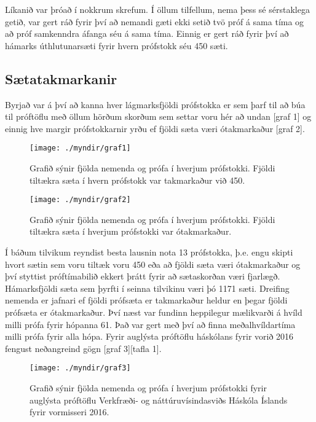 \documentclass[12pt]{article}
\begin{document}
Líkanið var þróað í nokkrum skrefum. Í öllum tilfellum, nema þess sé sérstaklega getið, var gert ráð fyrir því að nemandi gæti ekki setið tvö próf á sama tíma og að próf samkenndra áfanga séu á sama tíma. Einnig er gert ráð fyrir því að hámarks úthlutunarsæti fyrir hvern prófstokk séu 450 sæti.

\subsection{Sætatakmarkanir}

Byrjað var á því að kanna hver lágmarksfjöldi prófstokka er sem þarf til að búa til próftöflu með öllum hörðum skorðum sem settar voru hér að undan [graf 1] og einnig hve margir prófstokkarnir yrðu ef fjöldi sæta væri ótakmarkaður [graf 2]. 


\begin{figure}[h]
\centering
\texttt{[image: ./myndir/graf1]}
\caption{Grafið sýnir fjölda nemenda og prófa í hverjum prófstokki. Fjöldi tiltækra sæta í hvern prófstokk var takmarkaður við 450.}
\end{figure}

\begin{figure}[h]
    \centering
    \texttt{[image: ./myndir/graf2]}
    \caption{Grafið sýnir fjölda nemenda og prófa í hverjum prófstokki. Fjöldi tiltækra sæta í hverjum prófstokki var ótakmarkaður.}
\end{figure}





Í báðum tilvikum reyndist besta lausnin nota 13 prófstokka, þ.e. engu skipti hvort sætin sem voru tiltæk voru 450 eða að fjöldi sæta væri ótakmarkaður og því styttist próftímabilið ekkert þrátt fyrir að sætaskorðan væri fjarlægð. Hámarksfjöldi sæta sem þyrfti í seinna tilvikinu væri þó 1171 sæti. Dreifing nemenda er jafnari ef fjöldi prófsæta er takmarkaður heldur en þegar fjöldi prófsæta er ótakmarkaður. 
Því næst var fundinn heppilegur mælikvarði á hvíld milli prófa fyrir hópanna 61. Það var gert með því að finna meðalhvíldartíma milli prófa fyrir alla hópa. Fyrir auglýsta próftöflu háskólans fyrir vorið 2016 fengust neðangreind gögn  [graf 3][tafla 1].


\begin{figure}[h]
    \centering
    \texttt{[image: ./myndir/graf3]}
    \caption{Grafið sýnir fjölda nemenda og prófa í hverjum prófstokki fyrir auglýsta próftöflu Verkfræði- og náttúruvísindasviðs Háskóla Íslands fyrir vormisseri 2016.}
\end{figure}
\end{document}
